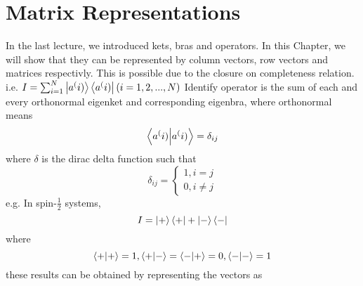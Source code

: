 \documentclass{book}
\begin{document}
\chapter{Matrix Representations}
In the last lecture, we introduced kets, bras and operators. In this Chapter, we will show that they can be represented by column vectors, row vectors and matrices respectivly. This is possible due to the closure on completeness relation. 
i.e. $I = \sum^N_{i=1} \ket{a^(i)} \bra{a^(i)} (i=1,2,...,N)$
Identify operator is the sum of each and every orthonormal eigenket and corresponding eigenbra, where orthonormal means
$$ \braket{a^(i)}{a^(i)} = \delta_{ij}$$
where $\delta$ is the dirac delta function such that
$$ \delta_{ij} = 
\begin{cases}
1, i = j \\
0, i \neq j
\end{cases}
$$
e.g. In spin-$\frac{1}{2}$ systems,
$$ I = \ket{+}\bra{+} + \ket{-}\bra{-}$$
where 
$$ \braket{+}{+} = 1, \braket{+}{-} = \braket{-}{+} = 0, \braket{-}{-} = 1$$
these results can be obtained by representing the vectors as
\end{document}
